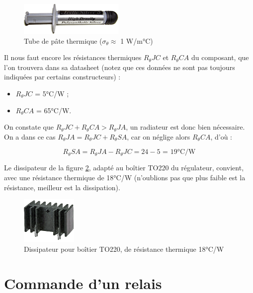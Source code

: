 \documentclass[a4paper]{article}
\begin{document}
\begin{figure}[H]
	\centering
	\includegraphics[scale=0.75]{Images/Pate_thermique.png}
	\caption{Tube de pâte thermique ($\sigma{}_{\theta} \approx$ 1 W/m°C)
		\label{Pate_thermique}}
\end{figure}

Il nous faut encore les résistances thermiques $R_{\theta}JC$ et $R_{\theta}CA$ du composant, que l'on trouvera dans sa datasheet \cite{7805} (notez que ces données ne sont pas toujours indiquées par certains constructeurs) :

\begin{itemize}
	\item $R_{\theta}JC$ = 5°C/W ;
	\item $R_{\theta}CA$ = 65°C/W.
\end{itemize}

On constate que $R_{\theta}JC + R_{\theta}CA > R_{\theta}JA$, un radiateur est donc bien nécessaire. On a dans ce cas $R_{\theta}JA = R_{\theta}JC + R_{\theta}SA$, car on néglige alors $R_{\theta}CA$, d'où :

\[R_{\theta}SA = R_{\theta}JA - R_{\theta}JC = 24 - 5\textrm{ = 19°C/W}\]

Le dissipateur de la figure \ref{Dissipateur_TO220_18}, adapté au boîtier TO220 du régulateur, convient, avec une résistance thermique de 18°C/W (n'oublions pas que plus faible est la résistance, meilleur est la dissipation).

\begin{figure}[H]
	\centering
	\includegraphics[scale=0.75]{Images/Dissipateur_TO220_18.png}
	\caption{Dissipateur pour boîtier TO220, de résistance thermique 18°C/W
		\label{Dissipateur_TO220_18}}
\end{figure}

\section{Commande d'un relais}

\end{document}
